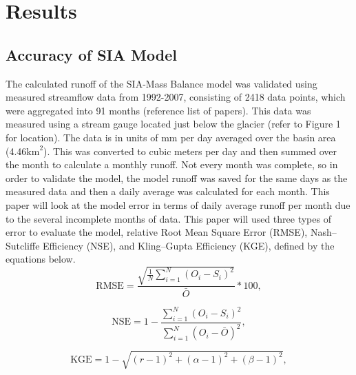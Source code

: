 \documentclass{article}
\begin{document}
\section{Results}
\subsection{Accuracy of SIA Model}
The calculated runoff of the SIA-Mass Balance model was validated using measured streamflow data from 1992-2007, consisting of 2418 
data points, which were aggregated into 91 months (reference list of papers). This data was measured using 
a stream gauge located just below the glacier (refer to Figure 1 for location). The data is in units of mm per day averaged over the basin area (4.46$\text{km}^2$). This was  
converted to cubic meters per day and then 
summed over the month to calculate a monthly runoff. Not every month was complete, so in order to validate the model, the model runoff was saved 
for the same days as the measured data and then a daily average was calculated for each month. 
This paper will look at the model error in terms of daily average runoff per month due to the several incomplete months of data. 
This paper will used 
three types of error to evaluate the model, relative Root Mean Square Error (RMSE), Nash–Sutcliffe Efficiency (NSE), and Kling–Gupta Efficiency 
(KGE), defined by the equations below. 
\begin{equation}
    \mathrm{RMSE} = \frac{\sqrt{\frac{1}{N}\sum_{i=1}^{N} \left( O_i - S_i \right)^2}}{\bar{O}}*100,
\end{equation}

\begin{equation}
    \mathrm{NSE} = 1 - \frac{\sum_{i=1}^{N}\left( O_i - S_i \right)^2}{\sum_{i=1}^{N}\left( O_i - \bar{O} \right)^2},
\end{equation}

\begin{equation}
    \mathrm{KGE} = 1 - \sqrt{ (r-1)^2 + (\alpha-1)^2 + (\beta-1)^2 },
\end{equation}
\end{document}
